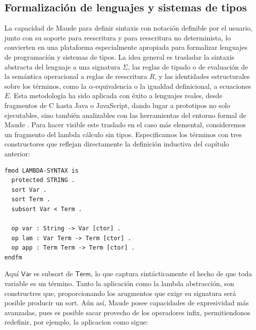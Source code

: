 \documentclass[a4paper,12pt]{report}
\theoremstyle{definition}
\theoremstyle{plain}
\theoremstyle{remark}
\begin{document}
\subsection{Formalizaci\'on de lenguajes y sistemas de tipos}
La capacidad de Maude para definir sintaxis con notaci\'on definible por el usuario, junto con su soporte para reescritura y para reescritura no determinista, lo convierten en una plataforma especialmente apropiada para formalizar lenguajes de programaci\'on y sistemas de tipos. La idea general es trasladar la sintaxis abstracta del lenguaje a una signatura $\Sigma$, las reglas de tipado o de evaluaci\'on de la sem\'antica operacional a reglas de reescritura $R$, y las identidades estructurales sobre los t\'erminos, como la $\alpha$-equivalencia o la igualdad definicional, a ecuaciones $E$. Esta metodolog\'ia ha sido aplicada con \'exito a lenguajes reales, desde fragmentos de C hasta Java o JavaScript, dando lugar a prototipos no solo ejecutables, sino tambi\'en analizables con las herramientas del entorno formal de Maude \citep{duran2019}.
\newline
\newline
Para hacer visible este traslado en el caso m\'as elemental, consideremos un fragmento del lambda c\'alculo sin tipos. Especificamos los t\'erminos con tres constructores que reflejan directamente la definici\'on inductiva del cap\'itulo anterior:

\begin{lstlisting}
fmod LAMBDA-SYNTAX is
  protected STRING .
  sort Var .
  sort Term .
  subsort Var < Term .

  op var : String -> Var [ctor] .
  op lam : Var Term -> Term [ctor] .
  op app : Term Term -> Term [ctor] .
endfm
\end{lstlisting}

Aquí $\mathsf{Var}$ es subsort de $\mathsf{Term}$, lo que captura sintácticamente el hecho de que toda variable es un término. Tanto la aplicación como la lambda abstracción, son constructres que, proporcionando los arugmentos que exige su signatura será posible producir un sort. Aún así, Maude posee capacidades de expresividad más avanzadas, pues es posible sacar provecho de los operadores infix, permitiendonos redefinir, por ejemplo, la aplicacion como sigue:
\end{document}
